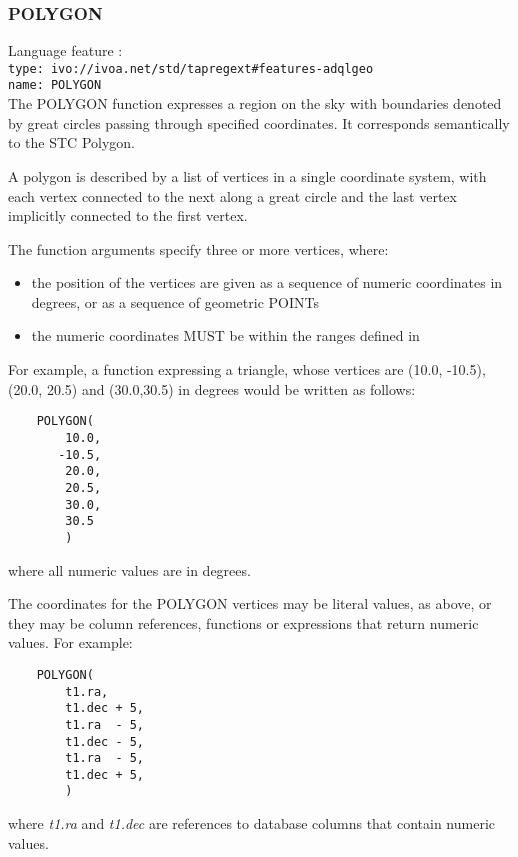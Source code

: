 \documentclass[11pt,a4paper]{ivoa}
\begin{document}
\subsubsection{POLYGON}
\label{sec:functions.geom.polygon}
{\footnotesize Language feature :}\\
{\footnotesize \verb|type: ivo://ivoa.net/std/tapregext#features-adqlgeo|}\\
{\footnotesize \verb|name: POLYGON|}\\

The POLYGON function expresses a region on the sky with boundaries denoted by great
circles passing through specified coordinates. It corresponds semantically
to the STC Polygon.

A polygon is described by a list of vertices in a single coordinate system, with
each vertex connected to the next along a great circle and the last vertex
implicitly connected to the first vertex.

The function arguments specify three or more vertices, where:
\begin{itemize}
    \item the position of the vertices are given as a sequence of
    numeric coordinates in degrees, or as a sequence of geometric POINTs
    \item the numeric coordinates MUST be within the ranges defined in
\end{itemize}

For example, a function expressing a triangle, whose vertices are (10.0,
-10.5), (20.0, 20.5) and (30.0,30.5) in degrees would be written
as follows:
\begin{verbatim}
    POLYGON(
        10.0,
       -10.5,
        20.0,
        20.5,
        30.0,
        30.5
        )
\end{verbatim}
\noindent
where all numeric values are in degrees.

The coordinates for the POLYGON vertices may be literal values, as above,
or they may be column references, functions or expressions that return
numeric values.
For example:
\begin{verbatim}
    POLYGON(
        t1.ra,
        t1.dec + 5,
        t1.ra  - 5,
        t1.dec - 5,
        t1.ra  - 5,
        t1.dec + 5,
        )
\end{verbatim}
\noindent
where \textit{t1.ra} and \textit{t1.dec} are references to database columns
that contain numeric values.
\end{document}
